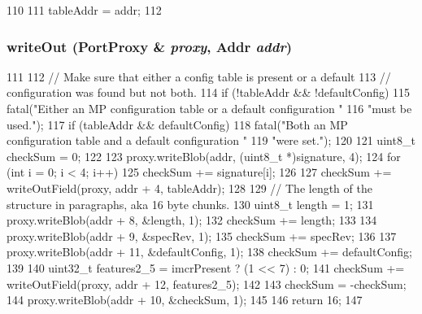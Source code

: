 \begin{DoxyCode}
110     {
111         tableAddr = addr;
112     }
\end{DoxyCode}
\hypertarget{classX86ISA_1_1IntelMP_1_1FloatingPointer_ad41fd44625bfa1495c2d729037dbf863}{
\subsubsection[{writeOut}]{ writeOut ({\bf PortProxy} \& {\em proxy}, \/  {\bf Addr} {\em addr})}}
\label{classX86ISA_1_1IntelMP_1_1FloatingPointer_ad41fd44625bfa1495c2d729037dbf863}



\begin{DoxyCode}
111 {
112     // Make sure that either a config table is present or a default
113     // configuration was found but not both.
114     if (!tableAddr && !defaultConfig)
115         fatal("Either an MP configuration table or a default configuration "
116                 "must be used.");
117     if (tableAddr && defaultConfig)
118         fatal("Both an MP configuration table and a default configuration "
119                 "were set.");
120 
121     uint8_t checkSum = 0;
122 
123     proxy.writeBlob(addr, (uint8_t *)signature, 4);
124     for (int i = 0; i < 4; i++)
125         checkSum += signature[i];
126 
127     checkSum += writeOutField(proxy, addr + 4, tableAddr);
128 
129     // The length of the structure in paragraphs, aka 16 byte chunks.
130     uint8_t length = 1;
131     proxy.writeBlob(addr + 8, &length, 1);
132     checkSum += length;
133 
134     proxy.writeBlob(addr + 9, &specRev, 1);
135     checkSum += specRev;
136 
137     proxy.writeBlob(addr + 11, &defaultConfig, 1);
138     checkSum += defaultConfig;
139 
140     uint32_t features2_5 = imcrPresent ? (1 << 7) : 0;
141     checkSum += writeOutField(proxy, addr + 12, features2_5);
142 
143     checkSum = -checkSum;
144     proxy.writeBlob(addr + 10, &checkSum, 1);
145 
146     return 16;
147 }
\end{DoxyCode}



